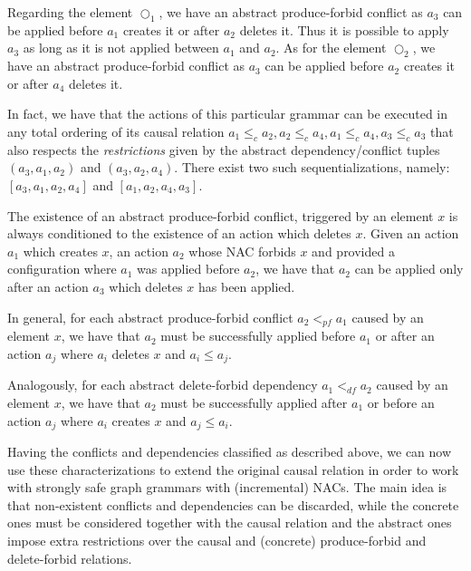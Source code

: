 \begin{example}
  Regarding the element $\Circle_1$, we have an abstract produce-forbid conflict as $a_3$ can be applied before $a_1$ creates it or after $a_2$ deletes it. Thus it is possible to apply $a_3$ as long as it is not applied between $a_1$ and $a_2$. As for the element $\Circle_2$, we have an abstract produce-forbid conflict as $a_3$ can be applied before $a_2$ creates it or after $a_4$ deletes it.

  In fact, we have that the actions of this particular grammar can be executed in any total ordering of its causal relation $a_1 \leq_c a_2, a_2 \leq_c a_4, a_1 \leq_c a_4, a_3 \leq_c a_3$ that also respects the \emph{restrictions} given by the abstract dependency/conflict tuples $(a_3,a_1,a_2)$ and $(a_3,a_2,a_4)$. There exist two such sequentializations, namely: $[a_3, a_1, a_2, a_4]$ and $[a_1,a_2,a_4,a_3]$.
\end{example}

\begin{remark} The existence of an abstract produce-forbid conflict, triggered by an element $x$ is always conditioned to the existence of an action which deletes $x$. Given an action $a_1$ which creates $x$, an action $a_2$ whose NAC forbids $x$ and provided a configuration where $a_1$ was applied before $a_2$, we have that $a_2$ can be applied only after an action $a_3$ which deletes $x$ has been applied.

  In general, for each abstract produce-forbid conflict $a_2 <_{pf} a_1$ caused by an element $x$, we have that $a_2$ must be successfully applied before $a_1$ or after an action $a_{j}$ where $a_i$ deletes $x$ and $a_i \leq a_j$.

  Analogously, for each abstract delete-forbid dependency $a_1 <_{df} a_2$ caused by an element $x$, we have that $a_2$ must be successfully applied after $a_1$ or before an action $a_j$ where $a_i$ creates $x$ and $a_j \leq a_i$.
\end{remark}

Having the conflicts and dependencies classified as described above, we can now use these characterizations to extend the original causal relation in order to work with strongly safe graph grammars with (incremental) NACs. The main idea is that non-existent conflicts and dependencies can be discarded, while the concrete ones must be considered together with the causal relation and the abstract ones impose extra restrictions over the causal and (concrete) produce-forbid and delete-forbid relations.


